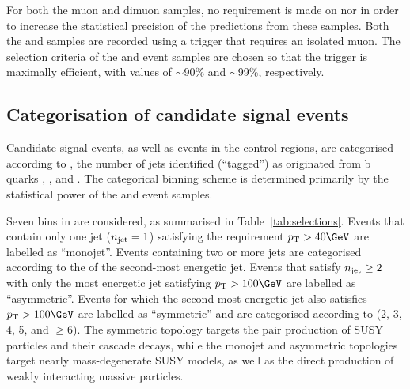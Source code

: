 For both the muon and dimuon samples, no requirement is made on
\alphat nor \bdphi in order to increase the statistical precision of
the predictions from these samples. Both the \mj and \mmj samples are
recorded using a trigger that requires an isolated muon. The selection
criteria of the \mj and \mmj event samples are chosen so that the
trigger is maximally efficient, with values of $\sim$90\% and
$\sim$99\%, respectively.


\subsection{Categorisation of candidate signal events}
\label{sec:categorisation}

Candidate signal events, as well as events in the control regions, are
categorised according to \njet, the number of jets identified
(``tagged'') as originated from b quarks \nb, \scalht, and \mht. The
categorical binning scheme is determined primarily by the statistical
power of the \mj and \mmj event samples.

Seven bins in \njet are considered, as summarised in
Table~\ref{tab:selections}. Events that contain only one jet ($n_{\mathrm{jet}} =
1$) satisfying the requirement $\Pt > 40\GeV$ are labelled as
``monojet''. Events containing two or more jets are categorised
according to the \Pt of the second-most energetic jet. Events that
satisfy $n_{\mathrm{jet}} \geq 2$ with only the most energetic jet satisfying
$\Pt > 100\GeV$ are labelled as ``asymmetric''. Events for which the
second-most energetic jet also satisfies $\Pt > 100\GeV$ are labelled
as ``symmetric'' and are categorised according to \njet (2, 3, 4, 5,
and $\geq$6). The symmetric topology targets the pair production of
SUSY particles and their cascade decays, while the monojet and
asymmetric topologies target nearly mass-degenerate SUSY models, as
well as the direct production of weakly interacting massive particles.


